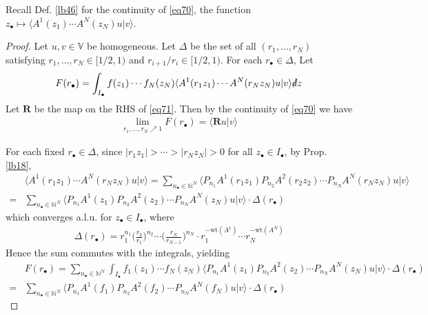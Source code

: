 \documentclass[12pt,b5paper,notitlepage]{article}
\theoremstyle{definition}
\theoremstyle{plain}
\newcommand{\bk}[1]{\langle {#1}\rangle}
\newcommand{\blt}{\bullet}
\newcommand{\Vbb}{\mathbb V}
\newcommand{\Nbb}{\mathbb N}
\newcommand{\Rbf}{\mathbf R}
\newcommand{\wt}{\mathrm{wt}}
\newcommand{\sd}{\slashed{d}}
\numberwithin{equation}{section}
\begin{document}
Recall Def. \ref{lb46} for the continuity of \eqref{eq70}, the function $z_\blt\mapsto \bk{A^1(z_1)\cdots A^N(z_N)u|v}$. %


\begin{proof}
Let $u,v\in\Vbb$ be homogeneous. Let $\Delta$ be the set of all $(r_1,\dots,r_N)$ satisfying $r_1,\dots,r_N\in[1/2,1)$ and $r_{i+1}/r_i\in[1/2,1)$. For each $r_\blt\in\Delta$, Let
\begin{align*}
F(r_\blt)=\int_{I_\blt}f(z_1)\cdots f_N(z_N)\bk{A^1(r_1z_1)\cdots A^N(r_Nz_N)u|v}\sd z
\end{align*}
Let $\Rbf$ be the map on the RHS of \eqref{eq71}. Then by the continuity of \eqref{eq70} we have
\begin{align*}
\lim_{r_1,\dots,r_N\nearrow 1}F(r_\blt)=\bk{\Rbf u|v}
\end{align*}



For each fixed $r_\blt\in\Delta$, since $|r_1z_1|>\cdots>|r_Nz_N|>0$ for all $z_\blt\in I_\blt$, by Prop. \ref{lb18},
\begin{align*}
&\bk{A^1(r_1z_1)\cdots A^N(r_Nz_N)u|v}=\sum_{n_\blt\in\Nbb^N}\bk{P_{n_1}A^1(r_1z_1)P_{n_2}A^2(r_2z_2)\cdots P_{n_N}A^N(r_Nz_N)u|v}\\
=&\sum_{n_\blt\in\Nbb^N}\bk{P_{n_1}A^1(z_1)P_{n_2}A^2(z_2)\cdots P_{n_N}A^N(z_N)u|v}\cdot \Delta(r_\blt)
\end{align*}
which converges a.l.u. for $z_\blt\in I_\blt$, where
\begin{align*}
\Delta(r_\blt)=r_1^{n_1} \Big(\frac{r_2}{r_1}\Big)^{n_2}\cdots  \Big(\frac{r_N}{r_{N-1}}\Big)^{n_N}\cdot r_1^{-\wt(A^1)}\cdots r_N^{-\wt(A^N)}
\end{align*}
Hence the sum commutes with the integrals, yielding
\begin{align*}
&F(r_\blt)=\sum_{n_\blt\in\Nbb^N}\int_{I_\blt}f_1(z_1)\cdots f_N(z_N)\bk{P_{n_1}A^1(z_1)P_{n_2}A^2(z_2)\cdots P_{n_N}A^N(z_N)u|v}\cdot \Delta(r_\blt)\\
=&\sum_{n_\blt\in\Nbb^N}\bk{P_{n_1}A^1(f_1)P_{n_2}A^2(f_2)\cdots P_{n_N}A^N(f_N)u|v}\cdot \Delta(r_\blt)\tag{$\lozenge$}\label{eq72}
\end{align*}




\end{proof}
\end{document}
